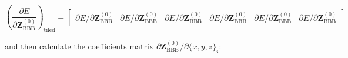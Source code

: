 \begin{equation}
\left(\frac{\partial{E}}{\partial{\mathbf{Z}^{(0)}_{\mathrm{BBB}}}}\right)_{\mathrm{tiled}} = 
\left[\begin{array}{cccccc}
\partial{E} / \partial{\mathbf{Z}^{(0)}_{\mathrm{BBB}}} & 
\partial{E} / \partial{\mathbf{Z}^{(0)}_{\mathrm{BBB}}} &
\partial{E} / \partial{\mathbf{Z}^{(0)}_{\mathrm{BBB}}} & 
\partial{E} / \partial{\mathbf{Z}^{(0)}_{\mathrm{BBB}}} &
\partial{E} / \partial{\mathbf{Z}^{(0)}_{\mathrm{BBB}}} & 
\partial{E} / \partial{\mathbf{Z}^{(0)}_{\mathrm{BBB}}} 
\end{array}
\right]
\end{equation}

\noindent and then calculate the coefficients matrix 
$\partial{\mathbf{Z}^{(0)}_{\mathrm{BBB}}} / \partial{\{x, y, z\}_i}$:

